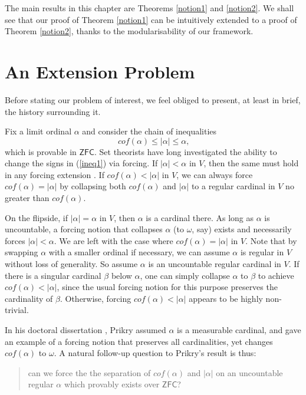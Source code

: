 \documentclass[12pt, twoside]{memoir}
\numberwithin{equation}{section}
\theoremstyle{definition}
\theoremstyle{remark}
\theoremstyle{definition}
\theoremstyle{definition}
\theoremstyle{definition}
\theoremstyle{remark}
\begin{document}
The main results in this chapter are Theorems \ref{notion1} and \ref{notion2}. We shall see that our proof of Theorem \ref{notion1} can be intuitively extended to a proof of Theorem \ref{notion2}, thanks to the modularisability of our framework.

\section{An Extension Problem}

Before stating our problem of interest, we feel obliged to present, at least in brief, the history surrounding it. 

Fix a limit ordinal $\alpha$ and consider the chain of inequalities
\begin{equation}\label{ineq1}
    cof(\alpha) \leq |\alpha| \leq \alpha \text{,}
\end{equation} 
which is provable in $\mathsf{ZFC}$. Set theorists have long investigated the ability to change the signs in (\ref{ineq1}) via forcing. If $|\alpha| < \alpha$ in $V$, then the same must hold in any forcing extension . If $cof(\alpha) < |\alpha|$ in $V$, we can always force $cof(\alpha) = |\alpha|$ by collapsing both $cof(\alpha)$ and $|\alpha|$ to a regular cardinal in $V$ no greater than $cof(\alpha)$.

On the flipside, if $|\alpha| = \alpha$ in $V$, then $\alpha$ is a cardinal there. As long as $\alpha$ is uncountable, a forcing notion that collapses $\alpha$ (to $\omega$, say) exists and necessarily forces $|\alpha| < \alpha$. We are left with the case where $cof(\alpha) = |\alpha|$ in $V$. Note that by swapping $\alpha$ with a smaller ordinal if necessary, we can assume $\alpha$ is regular in $V$ without loss of generality. So assume $\alpha$ is an uncountable regular cardinal in $V$. If there is a singular cardinal $\beta$ below $\alpha$, one can simply collapse $\alpha$ to $\beta$ to achieve $cof(\alpha) < |\alpha|$, since the usual forcing notion for this purpose preserves the cardinality of $\beta$. Otherwise, forcing $cof(\alpha) < |\alpha|$ appears to be highly non-trivial.

In his doctoral dissertation \cite{prikry}, Prikry assumed $\alpha$ is a measurable cardinal, and gave an example of a forcing notion that preserves all cardinalities, yet changes $cof(\alpha)$ to $\omega$. A natural follow-up question to Prikry's result is thus:

\begin{quote}
    can we force the the separation of $cof(\alpha)$ and $|\alpha|$ on an uncountable regular $\alpha$ which provably exists over $\mathsf{ZFC}$?
\end{quote}
\end{document}
